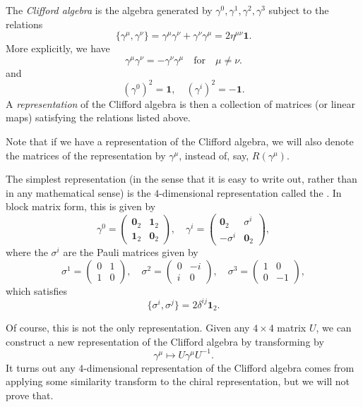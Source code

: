 \documentclass[a4paper]{article}
\begin{document}
\begin{defi}
  The \emph{Clifford algebra} is the algebra generated by $\gamma^0, \gamma^1, \gamma^2, \gamma^3$ subject to the relations
  \[
    \{\gamma^\mu, \gamma^\nu\} = \gamma^\mu \gamma^\nu + \gamma^\nu \gamma^\mu = 2 \eta^{\mu\nu}\mathbf{1}.
  \]
  More explicitly, we have
  \[
    \gamma^\mu \gamma^\nu = - \gamma^\nu \gamma^\mu\quad \text{for}\quad \mu \not= \nu.
  \]
  and
  \[
    (\gamma^0)^2 = \mathbf{1},\quad (\gamma^i)^2 = -\mathbf{1}.
  \]
  A \emph{representation} of the Clifford algebra is then a collection of matrices (or linear maps) satisfying the relations listed above.
\end{defi}
Note that if we have a representation of the Clifford algebra, we will also denote the matrices of the representation by $\gamma^\mu$, instead of, say, $R(\gamma^\mu)$.

\begin{eg}
  The simplest representation (in the sense that it is easy to write out, rather than in any mathematical sense) is the $4$-dimensional representation called the . In block matrix form, this is given by
  \[
    \gamma^0 =
    \begin{pmatrix}
      \mathbf{0}_2 & \mathbf{1}_2\\
      \mathbf{1}_2 & \mathbf{0}_2
    \end{pmatrix},\quad
    \gamma^i =
    \begin{pmatrix}
      \mathbf{0}_2 & \sigma^i\\
      -\sigma^i & \mathbf{0}_2
    \end{pmatrix},
  \]
  where the $\sigma^i$ are the Pauli matrices given by
  \[
    \sigma^1 =
    \begin{pmatrix}
      0 & 1\\
      1 & 0
    \end{pmatrix},\quad
    \sigma^2 =
    \begin{pmatrix}
      0 & -i\\
      i & 0
    \end{pmatrix},\quad
    \sigma^3 =
    \begin{pmatrix}
      1 & 0\\
      0 & -1
    \end{pmatrix},
  \]
  which satisfies
  \[
    \{\sigma^i, \sigma^j\} = 2 \delta^{ij} \mathbf{1}_2.
  \]
\end{eg}
Of course, this is not the only representation. Given any $4 \times 4$ matrix $U$, we can construct a new representation of the Clifford algebra by transforming by
\[
  \gamma^\mu \mapsto U \gamma^\mu U^{-1}.
\]
It turns out any $4$-dimensional representation of the Clifford algebra comes from applying some similarity transform to the chiral representation, but we will not prove that.
\end{document}
